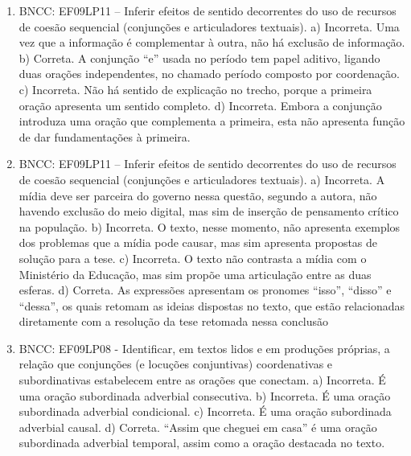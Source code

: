 \begin{enumerate}
\item
BNCC: EF09LP11 -- Inferir efeitos de sentido decorrentes do uso de recursos de coesão sequencial (conjunções e articuladores textuais). a) Incorreta. Uma vez que a informação é complementar à outra, não há exclusão de informação. b) Correta. A conjunção ``e'' usada no período tem papel aditivo, ligando duas orações independentes, no chamado período composto por coordenação. c) Incorreta. Não há sentido de explicação no trecho, porque a primeira oração apresenta um sentido completo. d) Incorreta. Embora a conjunção introduza uma oração que complementa a primeira, esta não apresenta função de dar fundamentações à primeira.

\item
BNCC: EF09LP11 -- Inferir efeitos de sentido decorrentes do uso de
recursos de coesão sequencial (conjunções e articuladores textuais). a) Incorreta. A mídia deve ser parceira do governo nessa questão, segundo a autora, não havendo exclusão do meio digital, mas sim de inserção de pensamento crítico na população. b) Incorreta. O texto, nesse momento, não apresenta exemplos dos problemas que a mídia pode causar, mas sim apresenta propostas de solução para a tese. c) Incorreta. O texto não contrasta a mídia com o Ministério da Educação, mas sim propõe uma articulação entre as duas esferas. d) Correta. As expressões apresentam os pronomes ``isso'', ``disso'' e ``dessa'', os quais retomam as ideias dispostas no texto, que estão relacionadas diretamente com a resolução da tese retomada nessa conclusão

\item
BNCC: EF09LP08 - Identificar, em textos lidos e em produções próprias, a relação que conjunções (e locuções conjuntivas) coordenativas e subordinativas estabelecem entre as orações que conectam. a) Incorreta. É uma oração subordinada adverbial consecutiva. b) Incorreta. É uma oração subordinada adverbial condicional. c) Incorreta. É uma oração subordinada adverbial causal. d) Correta. ``Assim que cheguei em casa'' é uma oração subordinada adverbial temporal, assim como a oração destacada no texto.
\end{enumerate}


